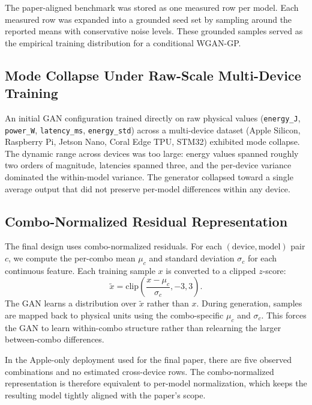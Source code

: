 \documentclass{svproc}
\begin{document}
The paper-aligned benchmark was stored as one measured row per model. Each
measured row was expanded into a grounded seed set by sampling around the
reported means with conservative noise levels. These grounded samples served
as the empirical training distribution for a conditional WGAN-GP.

\subsection{Mode Collapse Under Raw-Scale Multi-Device Training}
An initial GAN configuration trained directly on raw physical values
(\texttt{energy\_J}, \texttt{power\_W}, \texttt{latency\_ms},
\texttt{energy\_std}) across a multi-device dataset (Apple Silicon, Raspberry
Pi, Jetson Nano, Coral Edge TPU, STM32) exhibited mode collapse. The dynamic
range across devices was too large: energy values spanned roughly two orders
of magnitude, latencies spanned three, and the per-device variance dominated
the within-model variance. The generator collapsed toward a single average
output that did not preserve per-model differences within any device.

\subsection{Combo-Normalized Residual Representation}
The final design uses combo-normalized residuals. For each
$(\text{device}, \text{model})$ pair $c$, we compute the per-combo mean
$\mu_c$ and standard deviation $\sigma_c$ for each continuous feature. Each
training sample $x$ is converted to a clipped $z$-score:
\begin{equation}
\tilde{x} = \mathrm{clip}\!\left(\frac{x - \mu_c}{\sigma_c}, -3, 3\right).
\end{equation}
The GAN learns a distribution over $\tilde{x}$ rather than $x$. During
generation, samples are mapped back to physical units using the combo-specific
$\mu_c$ and $\sigma_c$. This forces the GAN to learn within-combo structure
rather than relearning the larger between-combo differences.

In the Apple-only deployment used for the final paper, there are five observed
combinations and no estimated cross-device rows. The combo-normalized
representation is therefore equivalent to per-model normalization, which keeps
the resulting model tightly aligned with the paper's scope.
\end{document}
